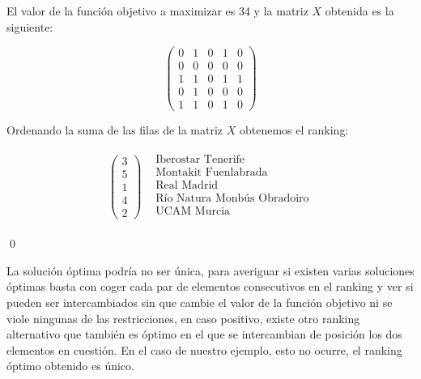 El valor de la función objetivo a maximizar es 34 y la matriz $X$ obtenida es la siguiente: 	
	
\[	
	\left( \begin{array}{ccccc}
	0 & 1 & 0 & 1 & 0\\
	0 & 0 & 0 & 0 & 0\\
	1 & 1 & 0 & 1 & 1\\
	0 & 1 & 0 & 0 & 0\\
	1 & 1 & 0 & 1 & 0
	\end{array} \right) 
\]
	
Ordenando la suma de las filas de la matriz $X$ obtenemos el ranking:

\[
\begin{array}{cc}
\left(\begin{array}{c}
3\\
5\\
1\\
4\\
2
\end{array} \right) & \begin{array}{c}
\text{Iberostar Tenerife} \\
\text{Montakit Fuenlabrada} \\
\text{Real Madrid} \\
\text{Río Natura Monbús Obradoiro} \\
\text{UCAM Murcia} \\
\end{array} 
\end{array} 
\]	
	
\qed	

La solución óptima podría no ser única, para averiguar si existen varias soluciones óptimas basta con coger cada par de elementos consecutivos en el ranking y ver si pueden ser intercambiados sin que cambie el valor de la función objetivo ni se viole ningunas de las restricciones, en caso positivo, existe otro ranking alternativo que también es óptimo en el que se intercambian de posición los dos elementos en cuestión. En el caso de nuestro ejemplo, esto no ocurre, el ranking óptimo obtenido es único.\\ 

